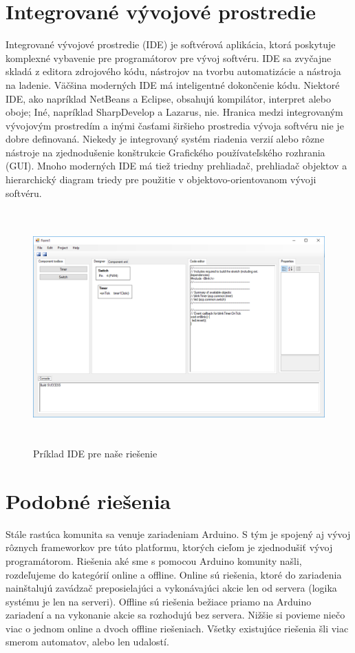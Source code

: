 \chapter{Integrované vývojové prostredie}

Integrované vývojové prostredie (IDE) je softvérová aplikácia, ktorá poskytuje komplexné vybavenie pre programátorov pre vývoj softvéru. IDE sa zvyčajne skladá z editora zdrojového kódu, nástrojov na tvorbu automatizácie a nástroja na ladenie. Väčšina moderných IDE má inteligentné dokončenie kódu. Niektoré IDE, ako napríklad NetBeans a Eclipse, obsahujú kompilátor, interpret alebo oboje; Iné, napríklad SharpDevelop a Lazarus, nie. Hranica medzi integrovaným vývojovým prostredím a inými časťami širšieho prostredia vývoja softvéru nie je dobre definovaná. Niekedy je integrovaný systém riadenia verzií alebo rôzne nástroje na zjednodušenie konštrukcie Grafického používateľského rozhrania (GUI). Mnoho moderných IDE má tiež triedny prehliadač, prehliadač objektov a hierarchický diagram triedy pre použitie v objektovo-orientovanom vývoji softvéru.

\begin{figure}[H]
	\begin{center}
		\includegraphics[height=9cm]{pics/ide.png}
		\caption{Príklad IDE pre naše riešenie}
	\end{center}
\end{figure}

\chapter{Podobné riešenia}
Stále rastúca komunita sa venuje zariadeniam Arduino. S tým je spojený aj vývoj rôznych frameworkov pre túto platformu, ktorých cieľom je zjednodušiť vývoj programátorom. Riešenia aké sme s pomocou Arduino komunity našli, rozdeľujeme do kategórií online a offline. Online sú riešenia, ktoré do zariadenia nainštalujú zavádzač preposielajúci a vykonávajúci akcie len od servera (logika systému je len na serveri). Offline sú riešenia bežiace priamo na Arduino zariadení a na vykonanie akcie sa rozhodujú bez servera. Nižšie si povieme niečo viac o jednom online a dvoch offline riešeniach. Všetky existujúce riešenia šli viac smerom automatov, alebo len udalostí.

